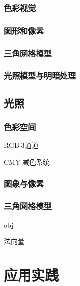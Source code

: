 \documentclass[UTF8,a4paper,12pt]{ctexbook}
\begin{document}
	\section{色彩视觉}
	
	\section{图形和像素}
	
	\section{三角网格模型}
	
	\section{光照模型与明暗处理}
		
		
		
		
\chapter{光照}
	\section{色彩空间}
		 RGB 3通道 
		 
		 CMY 减色系统
		  					
	\section{图象与像素}
	
	
	\section{三角网格模型}
		obj
		
		法向量
	



\part{应用实践}

	  
\end{document}
